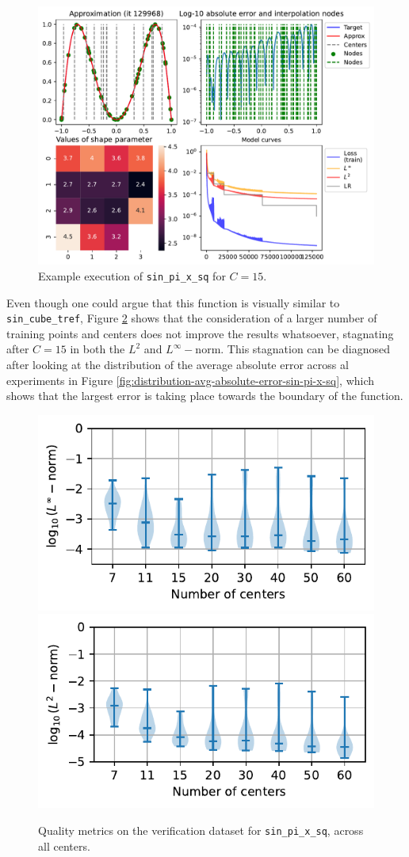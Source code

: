\documentclass[12pt]{report} %
\begin{document}
\begin{figure}
  \includegraphics[width=\textwidth]{imagenes/experiments/1d/statistical_1d_full_scheduler_interpolation/sin_pi_x_sq/sin_pi_x_sq-TR60-C15-Kgaussian_kernel-Sh2.5-14-E129968.pdf}
  \caption{Example execution of \texttt{sin\_pi\_x\_sq} for $C=15$.}
  \label{fig:example-execution-sin-pi-x-sq}
\end{figure}

Even though one could argue that this function is visually similar to \texttt{sin\_cube\_tref}, Figure \ref{fig:violins-l-sin-pi-x-sq} shows that the consideration of a larger number of training points and centers does not improve the results whatsoever, stagnating after $C=15$ in both the $L^2$ and $L^\infty-$norm. This stagnation can be diagnosed after looking at the distribution of the average absolute error across al experiments in Figure \ref{fig:distribution-avg-absolute-error-sin-pi-x-sq}, which shows that the largest error is taking place towards the boundary of the function.

\begin{figure}
  \includegraphics[width=.45\textwidth]{imagenes/experiments/1d/statistical_1d_full_scheduler_interpolation/sin_pi_x_sq/violins_linf_sin_pi_x_sq_endgame_2.pdf}
  \includegraphics[width=.45\textwidth]{imagenes/experiments/1d/statistical_1d_full_scheduler_interpolation/sin_pi_x_sq/violins_l2_sin_pi_x_sq_endgame.pdf}
  \caption{Quality metrics on the verification dataset for \texttt{sin\_pi\_x\_sq}, across all centers.}
  \label{fig:violins-l-sin-pi-x-sq}
\end{figure}
\end{document}
